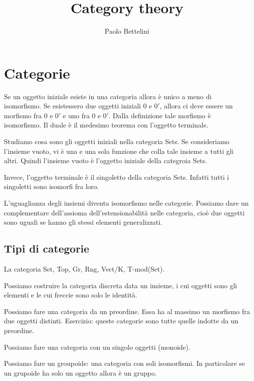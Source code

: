 \documentclass[a4paper]{article}
\title{Category theory}
\author{Paolo Bettelini}
\date{}
\begin{document}
\maketitle
\tableofcontents


\section{Categorie}

Se un oggetto iniziale esiste in una categoria allora è unico a meno di isomorfismo.
Se esistessero due oggetti iniziali \(0\) e \(0'\), allora ci deve essere
un morfismo fra \(0\) e \(0'\) e uno fra \(0\) e \(0'\).
Dalla definizione tale morfismo è isomorfismo.
Il duale è il medesimo teorema con l'oggetto terminale.

Studiamo cosa sono gli oggetti iniziali nella categoria Sets.
Se consideriamo l'insieme vuoto, vi è una e una sola funzione che colla tale insieme
a tutti gli altri. Quindi l'insieme vuoto è l'oggetto iniziale della categroia Sets.

Invece, l'oggetto terminale è il singoletto della categoria Sets.
Infatti tutti i singoletti sono isomorfi fra loro.

L'uguaglianza degli insiemi diventa isomorfismo nelle categorie.
Possiamo dare un complementare dell'assioma dell'estensionabilità
nelle categoria, cioè due oggetti sono uguali se hanno gli stessi elementi generalizzati.

\subsection{Tipi di categorie}

La categoria Set, Top, Gr, Rng, Vect/K, T-mod(Set).

Possiamo costruire la categoria discreta data un insieme, i cui oggetti sono gli elementi
e le cui freccie sono solo le identità.

Possiamo fare una categoria da un preordine.
Essa ha al massimo un morfismo fra due oggetti distinti.
Esercizio: queste categorie sono tutte quelle indotte da un preordine.

Possiamo fare una categoria con un singolo oggetti (monoide).

Possiamo fare un groupoide: una categoria con soli isomorfismi.
In particolare se un grupoide ha solo un oggetto allora è un gruppo.
\end{document}
